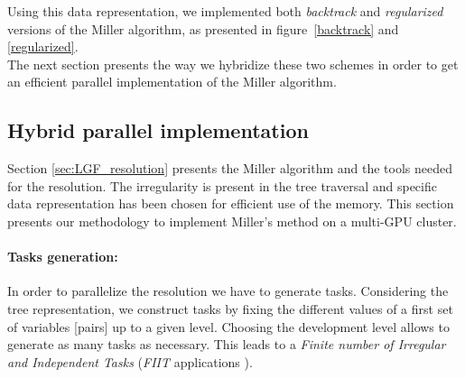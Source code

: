 Using this data representation, 
we implemented both \emph{backtrack} and \emph{regularized} versions of the Miller algorithm, as presented in figure~\ref{backtrack} and \ref{regularized}.
\\
The next section presents the way we hybridize these two schemes in order to get an efficient parallel implementation of the Miller algorithm.

\subsection{Hybrid parallel implementation}
\label{section:parallel_backtrack}
Section \ref{sec:LGF_resolution} presents the Miller algorithm and the tools needed for the resolution. 
The irregularity is present in the tree traversal and specific data representation has been chosen for efficient use of the memory. 
This section presents our methodology to implement Miller's method on a multi-GPU cluster.

\paragraph{Tasks generation: }
In order to parallelize the resolution we have to generate tasks. 
Considering the tree representation, we construct tasks by fixing the different values of a first set of variables [pairs] up to a given level. Choosing the development level allows to generate as many tasks as necessary. This leads to a \textit{Finite number of Irregular and Independent Tasks} (\emph{FIIT} applications \cite{krajecki1999object}). 

